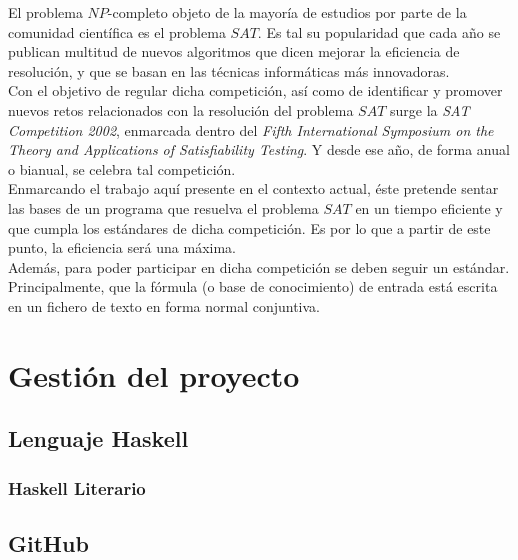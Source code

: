 El problema $NP$-completo objeto de la mayoría de estudios por parte de la comunidad científica es el problema $SAT$. Es tal su popularidad que cada año se publican multitud de nuevos algoritmos que dicen mejorar la eficiencia de resolución, y que se basan en las técnicas informáticas más innovadoras. \\

Con el objetivo de regular dicha competición, así como de identificar y promover nuevos retos relacionados con la resolución del problema $SAT$ surge la \textit{SAT Competition 2002}, enmarcada dentro del \textit{Fifth  International Symposium on the Theory and Applications of Satisfiability Testing}. Y desde ese año, de forma anual o bianual, se celebra tal competición. \\

Enmarcando el trabajo aquí presente en el contexto actual, éste pretende sentar las bases de un programa que resuelva el problema $SAT$ en un tiempo eficiente y que cumpla los estándares de dicha competición. Es por lo que a partir de este punto, la eficiencia será una máxima.\\

 Además, para poder participar en dicha competición se deben seguir un estándar. Principalmente, que la fórmula (o base de conocimiento) de entrada está escrita en un fichero de texto en forma normal conjuntiva.
 
 




\section{Gestión del proyecto}

\subsection{Lenguaje Haskell}

\subsubsection{Haskell Literario}

\subsection{GitHub}

